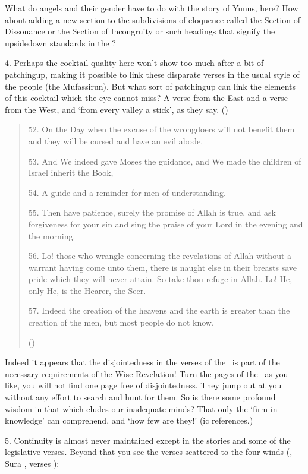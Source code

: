 \documentclass[12pt]{memoir}
\begin{document}
What do angels and their gender have to do with the story of Yunus, here?
How about adding a new section to the subdivisions of eloquence
called the Section of Dissonance or the Section of Incongruity
or such headings that signify the upside\–down standards in the \Quran?

4. Perhaps the cocktail quality here won’t show too much
after a bit of patching\–up,
making it possible to link these disparate verses
in the usual style of the people (the Mufassirun).
But what sort of patching\–up can link the elements of this cocktail
which the eye cannot miss?
A verse from the East and a verse from the West,
and ‘from every valley a stick’, as they say.
()

\begin{quote}
52. On the Day when the excuse of the wrongdoers will not benefit them
and they will be cursed and have an evil abode.

53. And We indeed gave Moses the guidance,
and We made the children of Israel inherit the Book,

54. A guide and a reminder for men of understanding.

55. Then have patience, surely the promise of Allah is true,
and ask forgiveness for your sin and sing the praise of your Lord
in the evening and the morning.

56. Lo! those who wrangle concerning the revelations of Allah
without a warrant having come unto them,
there is naught else in their breasts save pride which they will never attain.
So take thou refuge in Allah.
Lo! He, only He, is the Hearer, the Seer.

57. Indeed the creation of the heavens and the earth is greater
than the creation of the men, but most people do not know.

()
\end{quote}

Indeed it appears that the disjointedness in the verses of the \Quran\
is part of the necessary requirements of the Wise Revelation!
Turn the pages of the \Quran\ as you like,
you will not find one page free of disjointedness.
They jump out at you without any effort to search and hunt for them.
So is there some profound wisdom in that which eludes our inadequate minds?
That only the ‘firm in knowledge’ can comprehend, and ‘how few are they!’
(\Quran{}ic references.)

5. Continuity is almost never maintained except in the stories
and some of the legislative verses.
Beyond that you see the verses scattered to the four winds
(\Quran, Sura , verses ):
\end{document}
